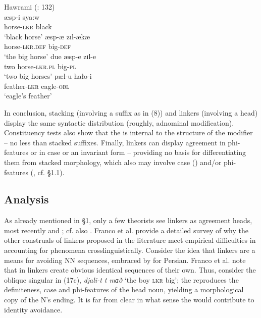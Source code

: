 \documentclass[output=paper]{langsci/langscibook}
\begin{document}
\ea%
    Hawrami  (\citealt{Holmberg2008}: 132)\label{ex:manzini:20}\\
    \ea
    \gll æsp-i     sya:w      \\
         horse-\textsc{lkr}  black\\
    \glt ‘black horse’
    \ex
    \gll æsp{}-æ     zɪl-ækæ\\
         horse-\textsc{lkr.def}  big-\textsc{def}\\
    \glt ‘the big horse’ 
    \ex
    \gll due   æsp-e    zɪl-e \\
         two   horse-\textsc{lkr.pl}  big-\textsc{pl} \\
    \glt ‘two big horses’
    \ex
    \gll pæl-u     hało-i\\
         feather-\textsc{lkr}   eagle-\textsc{obl}\\
    \glt ‘eagle’s feather’ 
    \z
\z        

In conclusion, stacking (involving a suffix as in (8)) and linkers (involving a head) display the same syntactic distribution (roughly, adnominal modification). Constituency tests also show that the  is internal to the structure of the modifier – no less than stacked suffixes. Finally, linkers can display agreement in phi-features or in case or an invariant form – providing no basis for differentiating them from stacked morphology, which also may involve case () and\slash or phi-features (, cf. §1.1).

\subsection{Analysis}

As already mentioned in §1, only a few theorists see linkers as agreement heads, most recently \citet{Philip2012} and \citet{Franco2015}; cf. also \citet{Zwart2006}. Franco et al. provide a detailed survey of why the other construals of linkers proposed in the literature meet empirical difficulties in accounting for  phenomena crosslinguistically. Consider the idea that linkers are a means for avoiding NN sequences, embraced by \citet{Richards2010} for Persian. Franco et al. note that in  linkers create obvious identical sequences of their own. Thus, consider the oblique singular in (17c), \textit{djali-t t mɑð} ‘the boy \textsc{lkr} big’; the  reproduces the definiteness, case and phi-features of the head noun, yielding a morphological copy of the N’s ending. It is far from clear in what sense the  would contribute to identity avoidance.
\end{document}
